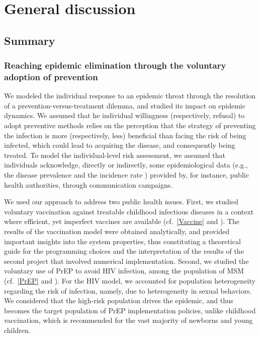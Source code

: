 %
\chapter{General discussion}
\label{Discussion}

\section{Summary}

\subsection{Reaching epidemic elimination through the voluntary adoption of prevention}

We modeled the individual response to an epidemic threat through the resolution of a prevention-versus-treatment dilemma, and studied its impact on epidemic dynamics. We assumed that he individual willingness (respectively, refusal) to adopt preventive methods relies on the perception that the strategy of preventing the infection is more (respectively, less) beneficial than facing the risk of being infected, which could lead to acquiring the disease, and consequently being treated. To model the individual-level risk assessment, we assumed that individuals acknowledge, directly or indirectly, some epidemiological data (e.g., the disease prevalence \cite[]{Jijon2017} and the incidence rate \cite[]{Jijon2021}) provided by, for instance, public health authorities, through communication campaigns. 

We used our approach to address two public health issues. First, we studied voluntary vaccination against treatable childhood infectious diseases in a context where efficient, yet imperfect vaccines are available (cf.~\autoref{Vaccine} and \cite{Jijon2017}). The results of the vaccination model were obtained analytically, and provided important insights into the system properties, thus constituting a theoretical guide for the programming choices and the interpretation of the results of the second project that involved numerical implementation. Second, we studied the voluntary use of PrEP to avoid HIV infection, among the population of MSM (cf.~\autoref{PrEP} and \cite{Jijon2021}). For the HIV model, we accounted for population heterogeneity regarding the risk of infection, namely, due to heterogeneity in sexual behaviors. We considered that the high-risk population drives the epidemic, and thus becomes the target population of PrEP implementation policies, unlike childhood vaccination, which is recommended for the vast majority of newborns and young children. 

